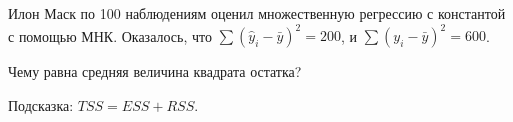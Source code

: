 
\begin{question}
Илон Маск по 100 наблюдениям оценил множественную регрессию с константой с помощью МНК.
Оказалось, что \(\sum (\hat y_i - \bar y)^2 = 200\), и \(\sum (y_i - \bar y)^2 = 600\).

Чему равна средняя величина квадрата остатка?
\end{question}

\begin{solution}
Подсказка: \(TSS = ESS + RSS\).
\end{solution}

